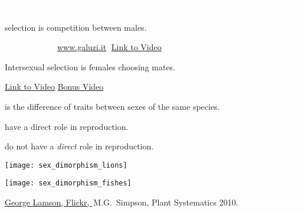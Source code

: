 \documentclass[t]{beamer}
\newcommand{\futuyma}[1]{%
	\ifthenelse{\isempty{#1}}%
	{Futuyma \& Kirkpatrick 2017, 4th ed.}%
	{Fig.~#1~Futuyma \& Kirkpatrick 2017, 4th ed.}%
}
\newcommand{\backskip}{\vspace{-0.5\baselineskip}}
\begin{document}

{
\begin{frame}[b]

\tinyfill  \textcolor{white}{\futuyma{}}
\end{frame}
}



{
	\begin{frame}{ selection is competition between males.}
	
	\vfilll
	
	\tiny \textcolor{white}{Luca Galuzzi, \href{http://www.galuzi.it}{www.galuzi.it}, 
		\hfill \href{http://www.youtube.com/watch?v=C7HCIGFdBt8}{Link to Video}}
	
\end{frame}
}


{
\begin{frame}{\textcolor{orange5}{Intersexual} \textcolor{white!95!black}{selection is females choosing mates.}}

\vfilll

\tiny \textcolor{white}{\href{https://youtu.be/IPfW7iolmgc}{Link to Video} 
	\hfill \href{https://youtu.be/1XkPeN3AWIE}{Bonus Video}}

\end{frame}
}



\begin{frame}{ is the difference of  traits between sexes of the same species.}

\backskip

\begin{multicols}{2}

\hangpara {} have a direct role in  reproduction.

\hangpara {} do not have a \emph{direct} role in reproduction.

\vspace{\baselineskip}

\centering

\texttt{[image: sex\_dimorphism\_lions]}

\columnbreak

\texttt{[image: sex\_dimorphism\_fishes]}


\end{multicols}


\vfilll

\tiny \href{https://www.flickr.com/photos/11847703@N05/8234519412}{George Lamson, Flickr, } \hfill
\textcopyright\,M.G.~Simpson, Plant Systematics 2010.
\end{frame}
\end{document}
